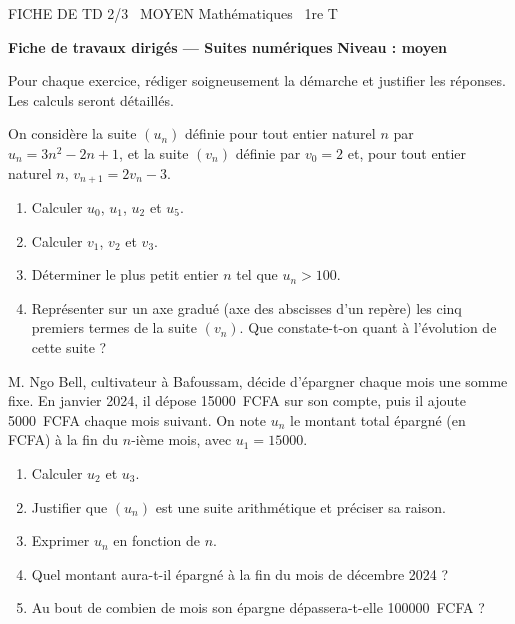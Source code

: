 \documentclass[11pt]{article}
\begin{document}
\begin{tcolorbox}[enhanced,colback=popink,colframe=popink,arc=10pt,boxrule=0pt,left=12pt,right=12pt,top=9pt,bottom=9pt]
{\color{white}\popxbold\small FICHE DE TD 2/3 \textbullet\ MOYEN \hfill Mathématiques \textbullet\ 1re T\par}
\end{tcolorbox}
\vspace{4pt}
\textbf{Fiche de travaux dirigés — Suites numériques} \hfill \textbf{Niveau : moyen}

Pour chaque exercice, rédiger soigneusement la démarche et justifier les réponses. Les calculs seront détaillés.

\begin{exercice}
On considère la suite $(u_n)$ définie pour tout entier naturel $n$ par $u_n = 3n^2 - 2n + 1$, et la suite $(v_n)$ définie par $v_0 = 2$ et, pour tout entier naturel $n$, $v_{n+1} = 2v_n - 3$.
\begin{enumerate}
\item Calculer $u_0$, $u_1$, $u_2$ et $u_5$.
\item Calculer $v_1$, $v_2$ et $v_3$.
\item Déterminer le plus petit entier $n$ tel que $u_n > 100$.
\item Représenter sur un axe gradué (axe des abscisses d'un repère) les cinq premiers termes de la suite $(v_n)$. Que constate-t-on quant à l'évolution de cette suite ?
\end{enumerate}
\end{exercice}

\begin{exercice}
M. Ngo Bell, cultivateur à Bafoussam, décide d'épargner chaque mois une somme fixe. En janvier 2024, il dépose \SI{15000}{FCFA} sur son compte, puis il ajoute \SI{5000}{FCFA} chaque mois suivant. On note $u_n$ le montant total épargné (en FCFA) à la fin du $n$-ième mois, avec $u_1 = 15000$.
\begin{enumerate}
\item Calculer $u_2$ et $u_3$.
\item Justifier que $(u_n)$ est une suite arithmétique et préciser sa raison.
\item Exprimer $u_n$ en fonction de $n$.
\item Quel montant aura-t-il épargné à la fin du mois de décembre 2024 ?
\item Au bout de combien de mois son épargne dépassera-t-elle \SI{100000}{FCFA} ?
\end{enumerate}
\end{exercice}
\end{document}
